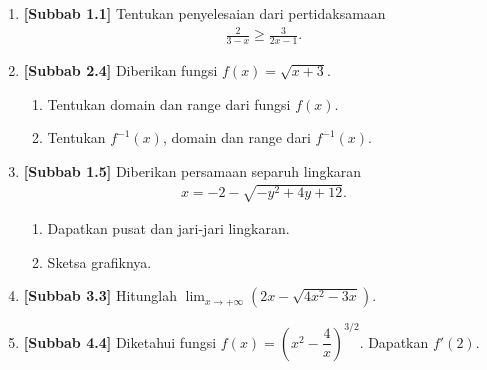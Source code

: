 \documentclass[10pt,openany,a4paper]{article}
\theoremstyle{definition}
\theoremstyle{definition}
\theoremstyle{plain}
\begin{document}
\newpage

\begin{enumerate}
    \item \textbf{[Subbab 1.1]} Tentukan penyelesaian dari pertidaksamaan
    \begin{align*}
        \frac{2}{3-x}\geq\frac{3}{2x-1}.
    \end{align*}

    \item \textbf{[Subbab 2.4]} Diberikan fungsi $f(x)=\sqrt{x+3}$.
    \begin{enumerate}
        \item Tentukan domain dan range dari fungsi $f(x)$.
        \item Tentukan $f^{-1}(x)$, domain dan range dari $f^{-1}(x)$.
    \end{enumerate}

    \item \textbf{[Subbab 1.5]} Diberikan persamaan separuh lingkaran
    \begin{align*}
        x=-2-\sqrt{-y^2+4y+12}.
    \end{align*}
    \begin{enumerate}
        \item Dapatkan pusat dan jari-jari lingkaran.
        \item Sketsa grafiknya.
    \end{enumerate}

    \item \textbf{[Subbab 3.3]} Hitunglah $\displaystyle\lim_{x\to+\infty}\left(2x-\sqrt{4x^2-3x}\right)$.

    \item \textbf{[Subbab 4.4]} Diketahui fungsi $f(x)=\left(x^2-\dfrac{4}{x}\right)^{3/2}$. Dapatkan $f'(2)$.
\end{enumerate}

\newpage
\end{document}
